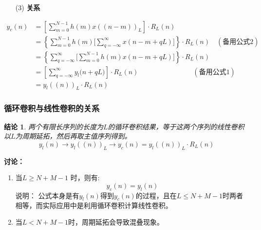 \documentclass[notheorems,compress,mathserif,table]{beamer}
\newtheorem{jielun}{结论}
\begin{document}
\begin{frame}[shrink]\frametitle{}%
\begin{enumerate}
  \item [(3)] \textbf{关系}  \par
\end{enumerate}  
  \begin{equation*}
    \begin{split}
    y_c(n)  &= \left[ \sum_{m=0}^{N-1} h(m) x((n-m))_L \right] \cdot R_L(n)\\
            &= \left\{ \sum_{m=0}^{N-1} h(m) \bigg[ \sum_{q=-\infty}^{\infty}x(n-m +qL)
                \bigg] \right\} \cdot R_L(n)  \quad(\mbox{备用公式2})\\
            &= \left\{ \sum_{q=-\infty}^{\infty} \bigg[ \sum_{m=0}^{N-1} h(m)x(n-m +qL)
                \bigg] \right\} \cdot R_L(n)  \\
            &= \left[ \sum_{q=-\infty}^{\infty}  y_l\big(n+qL\big)\right]  \cdot R_L(n)
               \quad\quad\quad\quad\quad\quad\quad\quad(\mbox{备用公式1}) \\
            &= y_l((n))_L \cdot R_L(n)
    \end{split}
  \end{equation*}

\end{frame}

\begin{frame}[shrink]\frametitle{循环卷积与线性卷积的关系}%
%
%
\begin{jielun}

   \quad\quad 两个有限长序列的长度为$L$的循环卷积结果，等于这两个序列的线性卷积以$L$为周期延拓，然后再取主值序列得到。
    $$y_l(n)  \longrightarrow  y_l((n))_L \longrightarrow   y_c(n) =  y_l((n))_L\cdot R_L(n) $$
\end{jielun}
%
%

   \textbf{讨论：}
    \begin{enumerate}
      \item 当$L\geq N+M-1$ 时，则有: \vspace{-0.3cm}
      $$y_c(n) = y_l(n)$$%
      说明：\quad
      公式本身是有$y_l(n)$得到$y_c(n)$的过程，且在$L\leq N+M-1$时两者相等，而实际应用中是利用循环卷积计算线性卷积。
      \item 当$L < N+M-1$时，周期延拓会导致混叠现象。
    \end{enumerate}

\end{frame}
%
\end{document}

